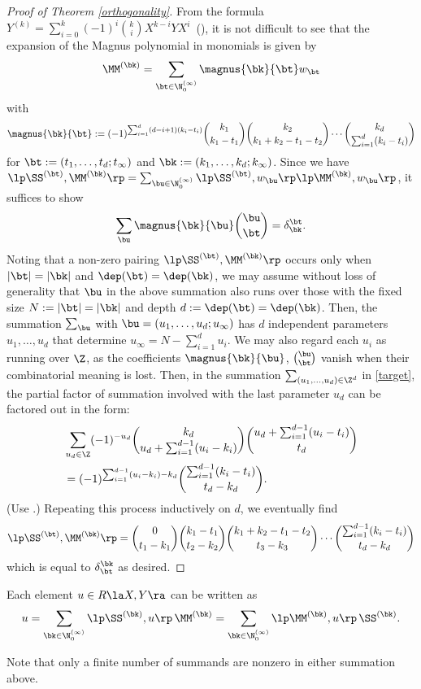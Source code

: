 \begin{proof}[Proof of Theorem \ref{orthogonality}]
From the formula~$Y^{(k)}=\sum_{i=0}^k (-1)^i\binom{k}{i}X^{k-i}YX^i$~(\cite[(4)]{M37}), 
it is not difficult to see that the expansion of the Magnus polynomial in monomials
is given by 
\begin{equation} \label{Mag-Mono}
\MM^{(\bk)}=\sum_{\bt \in\N_0^{(\infty)}}
\magnus{\bk}{\bt} w_{\bt} 
\end{equation}
with
\begin{equation}
\label{MagnusBino}
\magnus{\bk}{\bt}:=(-1)^{\sum_{i=1}^d (d-i+1)(k_i-t_i)}
\binom{k_1}{k_1-t_1} 
\binom{k_2}{k_1+k_2-t_1-t_2} \cdots
\binom{k_d}{\sum_{i=1}^d(k_i-t_i)}
\end{equation}
for $\bt:=(t_1,\dots, t_d;t_\infty)$ and $\bk:=(k_1,\dots,k_d;k_\infty)$.
Since we have $\lp\SS^{(\bt)},\MM^{(\bk)}\rp=\sum_{\bu\in\N_0^{(\infty)}}
\lp\SS^{(\bt)},w_\bu\rp \lp\MM^{(\bk)},w_\bu\rp$, it suffices to show
\begin{equation} \label{target}
\sum_\bu \magnus{\bk}{\bu} \binom{\bu}{\bt}=\delta_\bk^\bt.
\end{equation}
Noting that a non-zero pairing $\lp\SS^{(\bt)},\MM^{(\bk)}\rp$ occurs only when
$|\bt|=|\bk|$ and $\dep(\bt)=\dep(\bk)$, we may assume without loss of generality 
that $\bu$ in the above summation also runs over those
with the fixed size $N:=|\bt|=|\bk|$ and depth $d:=\dep(\bt)=\dep(\bk)$.
Then, the summation $\sum_\bu$ with $\bu=(u_1,\dots,u_d;u_\infty)$ 
has $d$ independent parameters $u_1,\dots, u_d$ that determine 
$u_\infty=N-\sum_{i=1}^d u_i$. We may also regard each $u_i$ as running over $\Z$,
as the coefficients $\magnus{\bk}{\bu}$, $\binom{\bu}{\bt}$ vanish when 
their combinatorial meaning is lost.
Then, in the summation $\sum_{(u_1,\dots,u_d)\in\Z^d}$ in \eqref{target},
the partial factor of summation 
involved with the last parameter $u_d$ can be factored out in the form:
\begin{align*}
&
\sum_{u_d\in\Z}(-1)^{-u_d}
\binom{k_d}{u_d+\sum_{i=1}^{d-1}(u_i-k_i)}
\binom{u_d+\sum_{i=1}^{d-1}(u_i-t_i)}{t_d} \\
&=
(-1)^{\sum_{i=1}^{d-1}(u_i-k_i)-k_d}
\binom{\sum_{i=1}^{d-1}(k_i-t_i)}{t_d-k_d}.
\end{align*}
(Use \cite[(5.24)]{GKP}.)
Repeating this process inductively on $d$, we eventually find
$$
\lp\SS^{(\bt)},\MM^{(\bk)}\rp=
\binom{0}{t_1-k_1}
\binom{k_1-t_1}{t_2-k_2}
\binom{k_1+k_2-t_1-t_2}{t_3-k_3}
\cdots
\binom{\sum_{i=1}^{d-1}(k_i-t_i)}{t_d-k_d}
$$
which is equal to $\delta^\bk_\bt$ as desired.
\end{proof}


\begin{Corollary} \label{coro}
Each element $u\in R\la X,Y\ra$ can be written as 
$$
u=\sum_{\bk \in\N_0^{(\infty)}}
\lp\SS^{(\bk)}, u\rp \,\MM^{(\bk)}
=\sum_{\bk \in\N_0^{(\infty)}}\lp\MM^{(\bk)}, u\rp \,\SS^{(\bk)}.
$$
\end{Corollary}

Note that only a finite number of summands are nonzero
in either summation above. 
